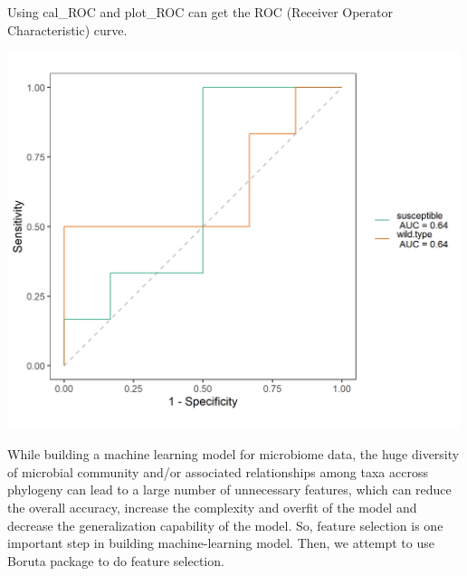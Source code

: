 \documentclass[
]{book}
\newenvironment{Shaded}{\begin{snugshade}}{\end{snugshade}}
\newcommand{\AttributeTok}[1]{\textcolor[rgb]{0.77,0.63,0.00}{#1}}
\newcommand{\CommentTok}[1]{\textcolor[rgb]{0.56,0.35,0.01}{\textit{#1}}}
\newcommand{\DecValTok}[1]{\textcolor[rgb]{0.00,0.00,0.81}{#1}}
\newcommand{\FloatTok}[1]{\textcolor[rgb]{0.00,0.00,0.81}{#1}}
\newcommand{\FunctionTok}[1]{\textcolor[rgb]{0.00,0.00,0.00}{#1}}
\newcommand{\NormalTok}[1]{#1}
\newcommand{\SpecialCharTok}[1]{\textcolor[rgb]{0.00,0.00,0.00}{#1}}
\begin{document}
Using cal\_ROC and plot\_ROC can get the ROC (Receiver Operator Characteristic) curve.

\begin{Shaded}
\end{Shaded}

\begin{center}\includegraphics[width=500px]{Images/plot_ROC_without_selection} \end{center}

While building a machine learning model for microbiome data,
the huge diversity of microbial community and/or associated relationships among taxa accross phylogeny can lead to a large number of unnecessary features,
which can reduce the overall accuracy, increase the complexity and overfit of the model and decrease the generalization capability of the model.
So, feature selection is one important step in building machine-learning model.
Then, we attempt to use Boruta package \citep{Kursa_Feature_2010} to do feature selection.

\begin{Shaded}
\end{Shaded}
\end{document}
